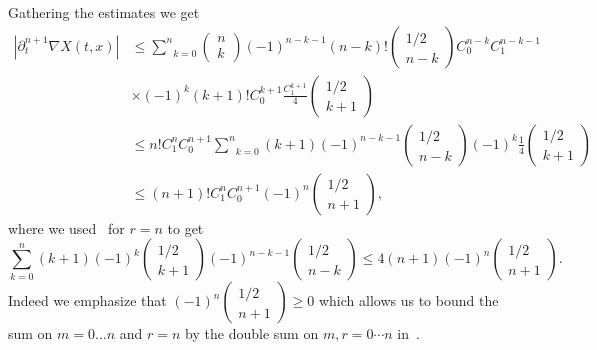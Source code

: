 \documentclass[10pt]{amsart}
\theoremstyle{definition}\newtheorem{defi}[theo]{Definition}\newtheorem{rema}[theo]{Remark}\newtheorem{exam}[theo]{Example}\newtheorem{exem}[theo]{Example}\newtheorem{nota}[theo]{Notation}
\renewcommand{\leq}{\leqslant}
\renewcommand{\geq}{\geqslant}
\begin{document}
Gathering the estimates we get
\begingroup
\allowdisplaybreaks
\begin{align*}
\left|\partial_t^{n+1} \nabla X(t,x)\right|&\leq \underset{k=0}{\overset{n}{\sum}}
\begin{pmatrix}n \\k
\end{pmatrix} (-1)^{n-k-1}(n-k)!
\begin{pmatrix}1/2 \\n-k
\end{pmatrix}C_0^{n-k}C_1^{n-k-1} \\
&\times (-1)^k(k+1)!C_0^{k+1}\frac{C_1^{k+1}}{4}
\begin{pmatrix}1/2 \\k+1
\end{pmatrix} \\
&\leq n! C_1^{n} C_0^{n+1}\underset{k=0}{\overset{n}{\sum}} (k+1) (-1)^{n-k-1}
\begin{pmatrix}1/2 \\n-k
\end{pmatrix} (-1)^k\frac{1}{4}
\begin{pmatrix}1/2 \\k+1
\end{pmatrix} \\
&\leq (n+1)! C_1^{n} C_0^{n+1}(-1)^n
\begin{pmatrix}1/2 \\n+1
\end{pmatrix},
\end{align*}
\endgroup
where we used~\cite[Lemma~4.2]{CVW} for $r=n$ to get
\begin{equation}\label{formule_magique2}
\underset{k=0}{\overset{n}{\sum}} (k+1) (-1)^k
\begin{pmatrix}1/2 \\k+1
\end{pmatrix} (-1)^{n-k-1}
\begin{pmatrix}1/2 \\n-k
\end{pmatrix} \leq 4(n+1)(-1)^n
\begin{pmatrix}1/2 \\n+1
\end{pmatrix}.
\end{equation}
Indeed we emphasize that $(-1)^n
(\begin{smallmatrix}1/2 \\n+1
\end{smallmatrix})\geq 0 $ which allows us to bound the sum on $m=0 \dots n$ and $r=n$ by the double sum on $m,r=0 \cdots n$ in~\cite[Lemma~4.2]{CVW}.
\end{document}

